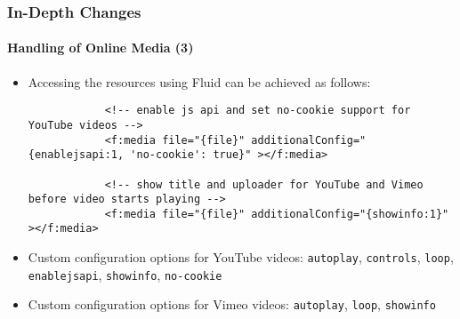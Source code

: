 \begin{frame}[fragile]
	\frametitle{In-Depth Changes}
	\framesubtitle{Handling of Online Media (3)}

	\lstset{basicstyle=\tiny\ttfamily}

	\begin{itemize}

		\item Accessing the resources using Fluid can be achieved as follows:

		\begin{lstlisting}
			<!-- enable js api and set no-cookie support for YouTube videos -->
			<f:media file="{file}" additionalConfig="{enablejsapi:1, 'no-cookie': true}" ></f:media>

			<!-- show title and uploader for YouTube and Vimeo before video starts playing -->
			<f:media file="{file}" additionalConfig="{showinfo:1}" ></f:media>
		\end{lstlisting}

		\item Custom configuration options for YouTube videos:\newline
			\small
				\texttt{autoplay}, \texttt{controls}, \texttt{loop}, \texttt{enablejsapi}, \texttt{showinfo}, \texttt{no-cookie}
			\normalsize

		\item Custom configuration options for Vimeo videos:\newline
			\small
				\texttt{autoplay}, \texttt{loop}, \texttt{showinfo}
			\normalsize
	\end{itemize}

\end{frame}


